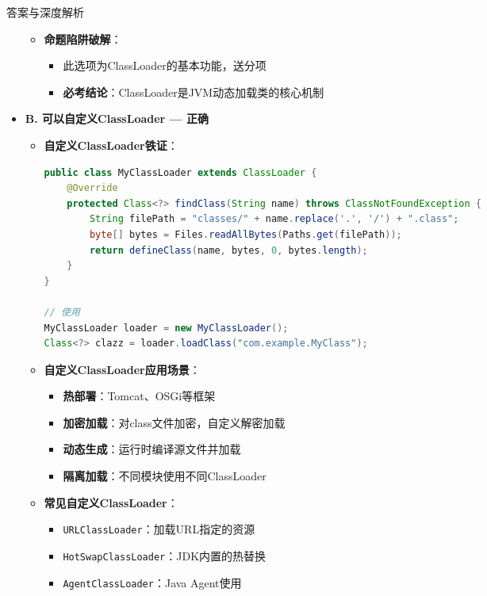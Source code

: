\documentclass[12pt, a4paper]{ctexart}
\begin{document}
\begin{bluebox}{答案与深度解析}
\begin{itemize}[label={}, leftmargin=*, nosep]
\begin{itemize}[label={}, leftmargin=*, nosep]
	\item \textbf{命题陷阱破解}：
	      \begin{itemize}[label={}, nosep]
		      \item 此选项为ClassLoader的基本功能，送分项
		      \item \textbf{必考结论}：ClassLoader是JVM动态加载类的核心机制
	      \end{itemize}
\end{itemize}

\item \textbf{B. 可以自定义ClassLoader — 正确}
\begin{itemize}[label={}, leftmargin=*, nosep]
	\item \textbf{自定义ClassLoader铁证}：
	      \begin{lstlisting}[language=Java]
public class MyClassLoader extends ClassLoader {
    @Override
    protected Class<?> findClass(String name) throws ClassNotFoundException {
        String filePath = "classes/" + name.replace('.', '/') + ".class";
        byte[] bytes = Files.readAllBytes(Paths.get(filePath));
        return defineClass(name, bytes, 0, bytes.length);
    }
}

// 使用
MyClassLoader loader = new MyClassLoader();
Class<?> clazz = loader.loadClass("com.example.MyClass");
      \end{lstlisting}

	\item \textbf{自定义ClassLoader应用场景}：
	      \begin{itemize}[label={}, nosep]
		      \item \textbf{热部署}：Tomcat、OSGi等框架
		      \item \textbf{加密加载}：对class文件加密，自定义解密加载
		      \item \textbf{动态生成}：运行时编译源文件并加载
		      \item \textbf{隔离加载}：不同模块使用不同ClassLoader
	      \end{itemize}

	\item \textbf{常见自定义ClassLoader}：
	      \begin{itemize}[label={}, nosep]
		      \item \texttt{URLClassLoader}：加载URL指定的资源
		      \item \texttt{HotSwapClassLoader}：JDK内置的热替换
		      \item \texttt{AgentClassLoader}：Java Agent使用
	      \end{itemize}


\end{itemize}
\end{itemize}
\end{bluebox}
\end{document}
